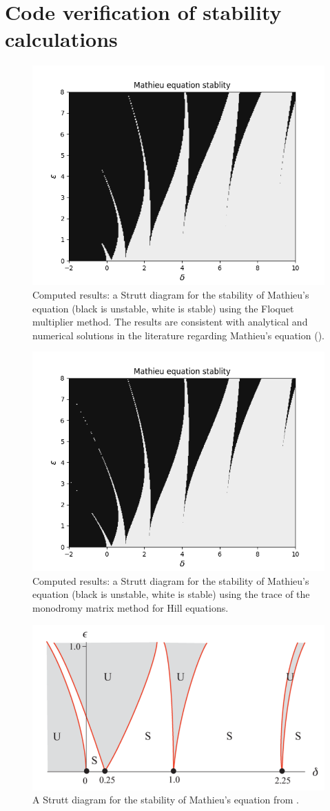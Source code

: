 \documentclass{article}
\begin{document}
\section*{Code verification of stability calculations}
\begin{figure}[h!]
\centering
\includegraphics[width=4.5in]{strutt_eig_rk4.png}
\caption{Computed results: a Strutt diagram for the stability of Mathieu's equation (black is unstable, white is 
stable) using the Floquet multiplier method. The results are consistent with analytical 
and numerical solutions in the literature regarding Mathieu's equation (\citet{Kovacic18}).
}
\end{figure}
\begin{figure}[h!]
\centering
\includegraphics[width=4.5in]{strutt_Tr_rk4.png}
\caption{Computed results: a Strutt diagram for the stability of Mathieu's equation (black is unstable, white is 
stable) using the trace of the monodromy matrix method for Hill equations.
}
\end{figure}

\begin{figure}[h!]
\centering
\includegraphics[width=4.5in]{fig3_Kovacic_2018.png}
\caption{A Strutt diagram for the stability of Mathieu's equation from \citet{Kovacic18}.
}
\end{figure}

\newpage
 
\end{document}
